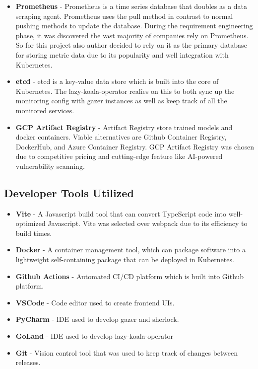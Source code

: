 \begin{itemize}
    \item \textbf{Prometheus} - Prometheus is a time series database that doubles as a data scraping agent. Prometheus uses the pull method in contrast to normal pushing methods to update the database. During the requirement engineering phase, it was discovered the vast majority of companies rely on Prometheus. So for this project also author decided to rely on it as the primary database for storing metric data due to its popularity and well integration with Kubernetes.
    \item \textbf{etcd} - etcd is a key-value data store which is built into the core of Kubernetes. The \ac{lazy-koala-operator} realies on this to both sync up the monitoring config with \ac{gazer} instances as well as keep track of all the monitored services.
    \item \textbf{GCP Artifact Registry} - Artifact Registry store trained models and docker containers. Viable alternatives are Github Container Registry, DockerHub, and Azure Container Registry. GCP Artifact Registry was chosen due to competitive pricing and cutting-edge feature like AI-powered vulnerability scanning. 
\end{itemize}

\subsection{Developer Tools Utilized}
\begin{itemize}
    \item \textbf{Vite} - A Javascript build tool that can convert TypeScript code into well-optimized Javascript. Vite was selected over webpack due to its efficiency to build times.
    \item \textbf{Docker} - A container management tool, which can package software into a lightweight self-containing package that can be deployed in Kubernetes.
    \item \textbf{Github Actions} - Automated CI/CD platform which is built into Github platform.
    \item \textbf{VSCode} - Code editor used to create frontend UIs.
    \item \textbf{PyCharm} - IDE used to develop \ac{gazer} and \ac{sherlock}.
    \item \textbf{GoLand} - IDE used to develop \ac{lazy-koala-operator}
    \item \textbf{Git} - Vision control tool that was used to keep track of changes between releases.
\end{itemize}

